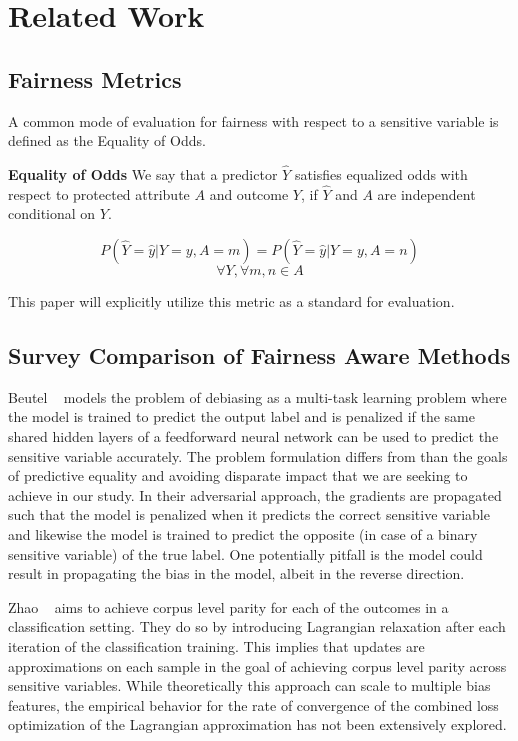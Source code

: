 \section{Related Work}
\subsection{Fairness Metrics}
A common mode of evaluation for fairness with respect to a sensitive variable is defined as the Equality of Odds. \cite{HardtPS16} 
\begin{definition}
\textbf{Equality of Odds} We say that a predictor $\hat{Y}$ satisfies equalized odds with respect to protected attribute $A$ and outcome $Y$, if $\hat{Y}$ and $A$ are independent conditional on $Y$.

\[  P(\hat{Y}=\hat{y}|Y=y, A=m) = P(\hat{Y}=\hat{y}|Y=y, A=n) \]
\[\forall Y, \forall m,n \in A \]

\end{definition}
This paper will explicitly utilize this metric as a standard for evaluation.

\subsection{Survey Comparison of Fairness Aware Methods}

Beutel ~\cite{Beutel2017DataDA} models the problem of debiasing as a multi-task learning problem where the model is trained to predict the output label and is  penalized if the same shared hidden layers of a feedforward neural network can be used to predict the sensitive variable accurately. The problem formulation differs from than the goals of predictive equality and avoiding disparate impact that we are seeking to achieve in our study. In their adversarial approach, the gradients are propagated such that the model is penalized when it predicts the correct sensitive variable and likewise the model is trained to predict the opposite (in case of a binary sensitive variable) of the true label. One potentially pitfall is the model could result in propagating the bias in the model, albeit in the reverse direction.

Zhao ~\cite{Zhao2017MenAL} aims to achieve corpus level parity for each of the outcomes in a classification setting. They do so by introducing Lagrangian relaxation after each iteration of the classification training. This implies that updates are approximations on each sample in the goal of achieving corpus level parity across sensitive variables. While theoretically this approach can scale to multiple bias features, the empirical behavior for the rate of convergence of the combined loss optimization of the Lagrangian approximation has not been extensively explored.

